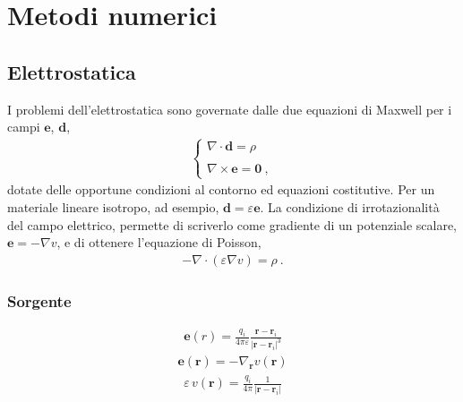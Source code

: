 \documentclass[letterpaper,10pt,italian]{jupyterBook}
\begin{document}
\chapter{Metodi numerici}
\label{\detokenize{ch/numerical-methods:metodi-numerici}}\label{\detokenize{ch/numerical-methods:classical-electromagnetism-numerics}}\label{\detokenize{ch/numerical-methods::doc}}

\section{Elettrostatica}
\label{\detokenize{ch/numerical-methods:elettrostatica}}
\sphinxAtStartPar
I problemi dell’elettrostatica sono governate dalle due equazioni di Maxwell per i campi \(\mathbf{e}\), \(\mathbf{d}\),
\begin{equation*}
\begin{split}\begin{cases}
  \nabla \cdot \mathbf{d} = \rho \\ \\
  \nabla \times \mathbf{e} = \mathbf{0 \ ,}
\end{cases}\end{split}
\end{equation*}
\sphinxAtStartPar
dotate delle opportune condizioni al contorno ed equazioni costitutive. Per un materiale lineare isotropo, ad esempio, \(\mathbf{d} = \varepsilon \mathbf{e}\). La condizione di irrotazionalità del campo elettrico, permette di scriverlo come gradiente di un potenziale scalare, \(\mathbf{e} = - \nabla v\), e di ottenere l’equazione di Poisson,
\begin{equation*}
\begin{split}-\nabla \cdot (\varepsilon \nabla v ) = \rho \ .\end{split}
\end{equation*}

\subsection{Sorgente}
\label{\detokenize{ch/numerical-methods:sorgente}}\begin{equation*}
\begin{split}\mathbf{e}(r) = \frac{q_i}{4 \pi \varepsilon}\frac{\mathbf{r} - \mathbf{r}_i}{|\mathbf{r} - \mathbf{r}_i|^3}\end{split}
\end{equation*}\begin{equation*}
\begin{split}\mathbf{e}(\mathbf{r}) = - \nabla_{\mathbf{r}} v(\mathbf{r})\end{split}
\end{equation*}\begin{equation*}
\begin{split}\varepsilon \, v(\mathbf{r}) = \frac{q_i}{4 \pi}\frac{1}{|\mathbf{r} - \mathbf{r}_i|}\end{split}
\end{equation*}
\end{document}
